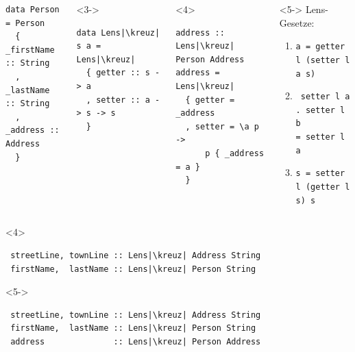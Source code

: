 \documentclass{beamer}
\newcommand{\kreuz}{$\,^\dag$} %
\newcommand{\hask}[1]{\texttt{#1}} %
\begin{document}
\begin{frame}[t,fragile]
\begin{columns}[t]
\begin{visibleenv}
\begin{verbatim}
data Person = Person
  { _firstName :: String
  , _lastName :: String
  , _address :: Address
  }
\end{verbatim}
    \end{visibleenv}
    \vspace{1em}
    \begin{visibleenv}<3->
\begin{verbatim}
data Lens|\kreuz| s a = Lens|\kreuz|
  { getter :: s -> a
  , setter :: a -> s -> s
  }
\end{verbatim}
    \end{visibleenv}
    \begin{onlyenv}<4>
\begin{verbatim}
address :: Lens|\kreuz| Person Address
address = Lens|\kreuz|
  { getter = _address
  , setter = \a p ->
      p { _address = a }
  }
\end{verbatim}
    \end{onlyenv}
    \begin{onlyenv}<5->
      Lens-Gesetze:
      \begin{enumerate}
        \small
        \item \hask{a = getter l (setter l a s)}
        \item \hask{  setter l a . setter l b} \\
        \hask{= setter l a}
        \item \hask{s = setter l (getter l s) s}
      \end{enumerate}
    \end{onlyenv}
  \end{columns}
\begin{onlyenv}<4>
\begin{verbatim}
 streetLine, townLine :: Lens|\kreuz| Address String
 firstName,  lastName :: Lens|\kreuz| Person String
\end{verbatim}
\end{onlyenv}
\begin{onlyenv}<5->
\begin{verbatim}
 streetLine, townLine :: Lens|\kreuz| Address String
 firstName,  lastName :: Lens|\kreuz| Person String
 address              :: Lens|\kreuz| Person Address
\end{verbatim}
\end{onlyenv}
\end{frame}
\end{document}
